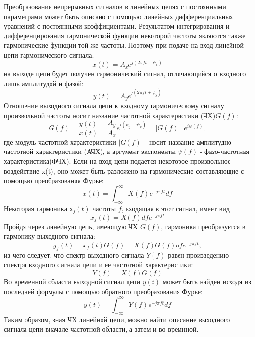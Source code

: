 Преобразование непрерывных сигналов в линейных цепях с постоянными параметрами может быть описано 
с помощью линейных дифференциальных уравнений с постоянными коэффициентами. Результатом интегрирования 
и дифференцирования гармонической функции некоторой частоты являются также гармонические функции той 
же частоты. Поэтому при подаче на вход линейной цепи гармонического сигнала.
$$ x(t) = A_x e^{j(2 \pi ft + \psi_x)} $$
на выходе цепи будет получен гармонический сигнал, отличающийся о входного лишь амплитудой и фазой:
$$ y(t) = A_y e^{j(2 \pi ft + \psi_y)} $$
Отношение выходного сигнала цепи к входному гармоническому сигналу произвольной частоты носит название 
частотной характеристики (ЧX)$G(f)$:
$$ G(f) = \frac{y(t)}{x(t)} = \frac{A_y}{A_x}e^{i(\psi_y - \psi_x)} =  \mid G(f) \mid e^{i \psi(f)},  $$
где модуль частотной характеристики $ \mid G(f) \mid$ носит название амплитудно-частотной характеристики (АЧХ), а аргумент экспоненты  $\psi(f) $ - фазо-частотная характеристика(ФЧХ).
Если на вход цепи подается некоторое произвольное воздействие x(t), оно может быть разложено на гармонические составляющие с помощью преобразования Фурье:
$$ x(t)= \int_{-\infty}^{\infty} X(f)e^{-j \pi ft} df $$
Некоторая гармоника $х_f(t)$ частоты $f$, входящая в этот сигнал, имеет вид
$$ x_f(t) = X(f)dfe^{-j \pi ft} $$
Пройдя через линейную цепь, имеющую ЧХ $G(f)$, гармоника преобразуется в гармонику выходного сигнала:
$$ y_f(t) = x_f(t)G(f) = X(f)G(f)dfe^{-j \pi ft}, $$
из чего следует, что спектр выходного сигнала  $Y(f)$ равен произведению спектра входного сигнала цепи и ее частотной характеристики:
$$ Y(f) = X(f)G(f) $$ 
Во временной области выходной сигнал цепи $y(t)$ может быть 
найден исходя из последней формулы с помощью обратного преобразования Фурье: 
$$ y(t)= \int_{-\infty}^{\infty} Y(f)e^{-j \pi ft} df $$
Таким образом, зная ЧХ линейной цепи, можно найти описание выходного сигнала цепи вначале частотной области, а затем и во времнной.  

